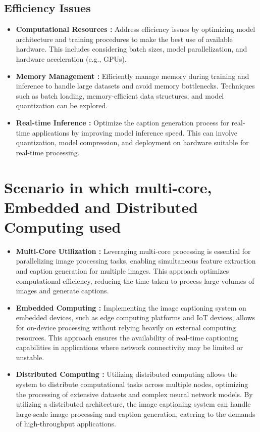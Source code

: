 \documentclass[oneside,a4paper,12pt]{report}
\begin{document}
\subsection{ Efficiency Issues}
\begin{itemize}
\item \textbf{Computational Resources :} Address efficiency issues by optimizing model architecture and training procedures to make the best use of available hardware. This includes considering batch sizes, model parallelization, and hardware acceleration (e.g., GPUs).
\item \textbf{Memory Management : }Efficiently manage memory during training and inference to handle large datasets and avoid memory bottlenecks. Techniques such as batch loading, memory-efficient data structures, and model quantization can be explored.

\item \textbf{Real-time Inference :} Optimize the caption generation process for real-time applications by improving model inference speed. This can involve quantization, model compression, and deployment on hardware suitable for real-time processing.
\end{itemize}

\section{Scenario in which multi-core, Embedded and Distributed Computing used}
\begin{itemize}
\item\textbf{ Multi-Core Utilization :} Leveraging multi-core processing is essential for parallelizing image processing tasks, enabling simultaneous feature extraction and caption generation for multiple images. This approach optimizes computational efficiency, reducing the time taken to process large volumes of images and generate captions.

\item \textbf{Embedded Computing :} Implementing the image captioning system on embedded devices, such as edge computing platforms and IoT devices, allows for on-device processing without relying heavily on external computing resources. This approach ensures the availability of real-time captioning capabilities in applications where network connectivity may be limited or unstable.
\item \textbf{Distributed Computing :} Utilizing distributed computing allows the system to distribute computational tasks across multiple nodes, optimizing the processing of extensive datasets and complex neural network models. By utilizing a distributed architecture, the image captioning system can handle large-scale image processing and caption generation, catering to the demands of high-throughput applications.
\end{itemize}
\end{document}
